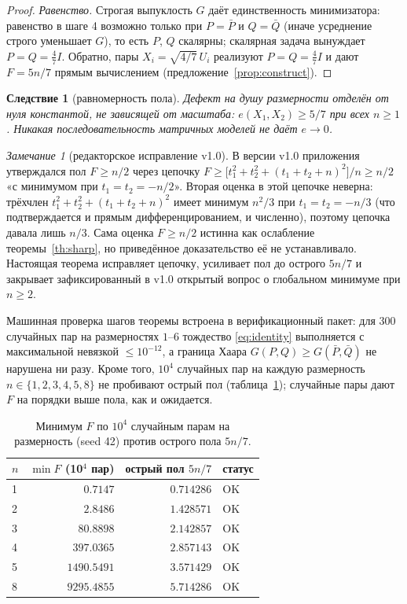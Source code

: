 \documentclass[11pt,a4paper]{article}
\theoremstyle{plain}
\newtheorem{corollary}[theorem]{Следствие}
\theoremstyle{definition}
\theoremstyle{remark}
\newtheorem{remark}[theorem]{Замечание}
\begin{document}
\begin{proof}
\emph{Равенство.} Строгая выпуклость $G$ даёт единственность
минимизатора: равенство в шаге 4 возможно только при $P=\bar P$ и
$Q=\bar Q$ (иначе усреднение строго уменьшает $G$), то есть $P$, $Q$
скалярны; скалярная задача вынуждает $P=Q=\frac47 I$. Обратно, пары
$X_i=\sqrt{4/7}\,U_i$ реализуют $P=Q=\frac47I$ и дают $F=5n/7$
прямым вычислением (предложение~\ref{prop:construct}).
\end{proof}

\begin{corollary}[равномерность пола]\label{cor:uniform}
Дефект на душу размерности отделён от нуля константой, не зависящей от
масштаба: $e(X_1,X_2)\ge 5/7$ при всех $n\ge 1$. Никакая
последовательность матричных моделей не даёт $e\to 0$.
\end{corollary}

\begin{remark}[редакторское исправление v1.0]\label{rem:v1}
В версии v1.0 приложения утверждался пол $F\ge n/2$ через цепочку
$F\ge\bigl[t_1^2+t_2^2+(t_1+t_2+n)^2\bigr]/n\ge n/2$ «с минимумом при
$t_1=t_2=-n/2$». Вторая оценка в этой цепочке неверна: трёхчлен
$t_1^2+t_2^2+(t_1+t_2+n)^2$ имеет минимум $n^2/3$ при $t_1=t_2=-n/3$
(что подтверждается и прямым дифференцированием, и численно), поэтому
цепочка давала лишь $n/3$. Сама оценка $F\ge n/2$ истинна как ослабление
теоремы~\ref{th:sharp}, но приведённое доказательство её не
устанавливало. Настоящая теорема исправляет цепочку, усиливает пол до
острого $5n/7$ и закрывает зафиксированный в v1.0 открытый вопрос о
глобальном минимуме при $n\ge 2$.
\end{remark}

Машинная проверка шагов теоремы встроена в верификационный пакет: для
300 случайных пар на размерностях $1$--$6$ тождество \eqref{eq:identity}
выполняется с максимальной невязкой $\le 10^{-12}$, а граница Хаара
$G(P,Q)\ge G(\bar P,\bar Q)$ не нарушена ни разу. Кроме того, $10^4$
случайных пар на каждую размерность $n\in\{1,2,3,4,5,8\}$ не пробивают
острый пол (таблица~\ref{tab:trace}); случайные пары дают $F$ на порядки
выше пола, как и ожидается.

\begin{table}[h]
\centering\small
\caption{Минимум $F$ по $10^4$ случайным парам на размерность (seed 42)
против острого пола $5n/7$.}
\label{tab:trace}
\begin{tabularx}{0.82\textwidth}{l r r l}
\toprule
$n$ & $\min F$ (10$^4$ пар) & острый пол $5n/7$ & статус \\
\midrule
\rowcolor{rowlight}
1 & $0.7147$ & $0.714286$ & OK \\
2 & $2.8486$ & $1.428571$ & OK \\
3 & $80.8898$ & $2.142857$ & OK \\
\rowcolor{rowlight}
4 & $397.0365$ & $2.857143$ & OK \\
5 & $1490.5491$ & $3.571429$ & OK \\
8 & $9295.4855$ & $5.714286$ & OK \\
\bottomrule
\end{tabularx}
\end{table}
\end{document}
